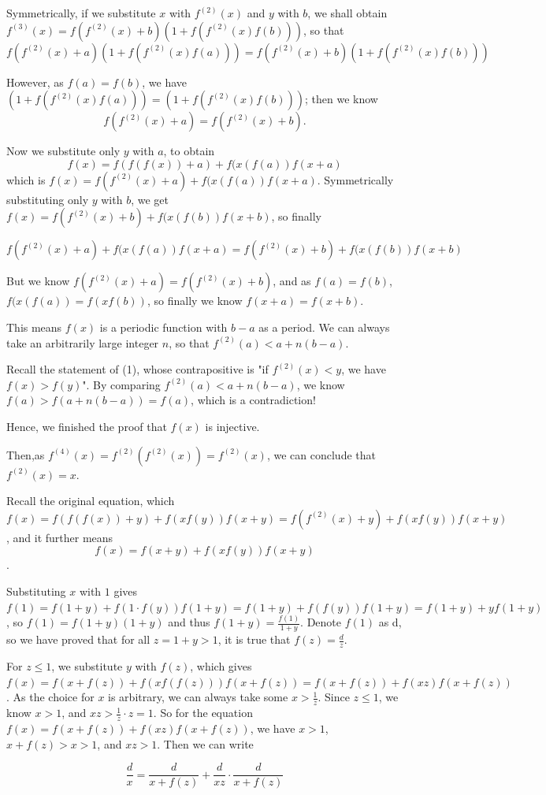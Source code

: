 \begin{enumerate}
 Symmetrically, if we substitute $x$ with $f^{(2)}(x)$ and $y$ with $b$, we shall obtain $f^{(3)}(x)=f(f^{(2)}(x)+b)(1+f(f^{(2)}(x)f(b)))$, so that 
 \[f(f^{(2)}(x)+a)(1+f(f^{(2)}(x)f(a)))=f(f^{(2)}(x)+b)(1+f(f^{(2)}(x)f(b)))\]

 However, as $f(a)=f(b)$, we have $(1+f(f^{(2)}(x)f(a)))=(1+f(f^{(2)}(x)f(b)))$; then we know 
 \[f(f^{(2)}(x)+a)=f(f^{(2)}(x)+b).\]

 Now we substitute only $y$ with $a$, to obtain 
 \[f(x)=f(f(f(x))+a)+f(x(f(a))f(x+a)\] which is $f(x)=f(f^{(2)}(x)+a)+f(x(f(a))f(x+a)$. Symmetrically substituting only $y$ with $b$, we get $f(x)=f(f^{(2)}(x)+b)+f(x(f(b))f(x+b)$, so finally

 
 \[f(f^{(2)}(x)+a)+f(x(f(a))f(x+a)=f(f^{(2)}(x)+b)+f(x(f(b))f(x+b)\]

 But we know $f(f^{(2)}(x)+a)=f(f^{(2)}(x)+b)$, and as $f(a)=f(b)$, $f(x(f(a))=f(xf(b))$, so finally we know $f(x+a)=f(x+b)$.

 This means $f(x)$ is a periodic function with $b-a$ as a period. We can always take an arbitrarily large integer $n$, so that $f^{(2)}(a)<a+n(b-a)$.

 Recall the statement of (1), whose contrapositive is "if $f^{(2)}(x)<y$, we have $f(x)>f(y)$". By comparing $f^{(2)}(a)<a+n(b-a)$, we know $f(a)>f(a+n(b-a))=f(a)$, which is a contradiction!

 Hence, we finished the proof that $f(x)$ is injective.

 Then,as $f^{(4)}(x)=f^{(2)}(f^{(2)}(x))=f^{(2)}(x)$, we can conclude that $f^{(2)}(x)=x$.

 Recall the original equation, which $f(x)=f(f(f(x))+y)+f(xf(y))f(x+y)=f(f^{(2)}(x)+y)+f(xf(y))f(x+y)$, and it further means 
 \[f(x)=f(x+y)+f(xf(y))f(x+y)\].

 Substituting $x$ with $1$ gives $f(1)=f(1+y)+f(1\cdot f(y))f(1+y)=f(1+y)+f(f(y))f(1+y)=f(1+y)+yf(1+y)$, so $f(1)=f(1+y)(1+y)$ and thus $f(1+y)=\frac{f(1)}{1+y}$. Denote $f(1)$ as d, so we have proved that for all $z=1+y>1$, it is true that $f(z)=\frac{d}{z}$.

 For $z\leq 1$, we substitute $y$ with $f(z)$, which gives $f(x)=f(x+f(z))+f(xf(f(z)))f(x+f(z))=f(x+f(z))+f(xz)f(x+f(z))$. As the choice for $x$ is arbitrary, we can always take some $x>\frac{1}{z}$. Since $z\leq 1$, we know $x>1$, and $xz>\frac{1}{z}\cdot z=1$. So for the equation $f(x)=f(x+f(z))+f(xz)f(x+f(z))$, we have $x>1$, $x+f(z)>x>1$, and $xz>1$. Then we can write 

 
 \[\frac{d}{x}=\frac{d}{x+f(z)}+\frac{d}{xz}\cdot\frac{d}{x+f(z)}\]


\end{enumerate}
